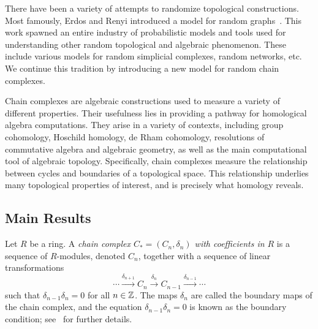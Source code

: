 There have been a variety of attempts to randomize topological
constructions. Most famously, Erdos and Renyi introduced a model
for random graphs~\cite{erdos_random_1959, erdos_evolution_1960}. 
This work spawned an entire industry of probabilistic
models and tools used for understanding other random topological
and algebraic phenomenon. These include various models for
random simplicial complexes, random networks, etc. We continue this tradition
by introducing a new model for random chain complexes.

Chain complexes are algebraic constructions used to measure a variety of 
different properties. Their usefulness lies in providing a pathway
for homological algebra computations. They arise in a variety of contexts,
including group cohomology, Hoschild homology, de Rham cohomology, 
resolutions of commutative algebra and algebraic geometry, as well
as the main computational tool of algebraic topology. Specifically,
chain complexes measure the relationship between cycles and boundaries
of a topological space. This relationship underlies many topological
properties of interest, and is precisely what homology reveals. 

%

\subsection*{Main Results}

Let $R$ be a ring. A {\em chain complex $C_*=(C_n, \delta_n)$ with coefficients in
$R$} is a sequence of $R$-modules, denoted $C_n$, together with a sequence of
linear transformations 
\[
  \cdots \xrightarrow{\delta_{n+1}} C_n \xrightarrow{\delta_n}
  C_{n-1} \xrightarrow{\delta_{n-1}} \cdots
\]
such that $\delta_{n-1}\delta_n = 0$ for all $n \in \mathbb{Z}$. The maps $\delta_n$
are called the boundary maps of the chain complex, and the equation
$\delta_{n-1} \delta_n = 0$ is known as the boundary condition;
see~\cite{hatcher2002algebraic} for further details.

